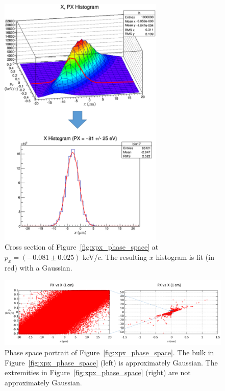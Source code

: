 \begin{figure}[H]
  \centering
    \includegraphics[width=0.7\textwidth]{Figures/xpx_phase_space_cut} 
  \caption[Cross section of Figure~\ref{fig:xpx_phase_space} at $p_x=0.08$ keV/$c$.]{Cross section of Figure~\ref{fig:xpx_phase_space} at $p_x=(-0.081 \pm 0.025)$ keV/$c$. The resulting $x$ histogram is fit (in red) with a Gaussian.}
  \label{fig:xpx_phase_space_cut}
\end{figure}

\begin{figure}[H]
  \centering
    \includegraphics[width=\textwidth]{Figures/phase_space_portrait} 
  \caption[Phase space portrait of Figure~\ref{fig:xpx_phase_space}.]{Phase space portrait of Figure~\ref{fig:xpx_phase_space}. The bulk in Figure~\ref{fig:xpx_phase_space} (left) is approximately Gaussian. The extremities in Figure~\ref{fig:xpx_phase_space} (right) are not approximately Gaussian.}
  \label{fig:phase_space_portrait}
\end{figure}

